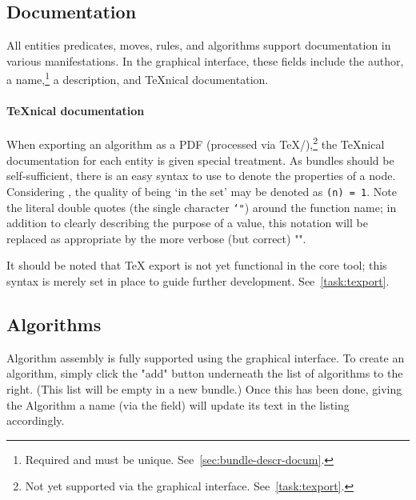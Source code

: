 \subsection{Documentation}
All entities \Dash predicates, moves, rules, and algorithms \Dash support documentation in various manifestations.
In the graphical interface, these fields include the author,
  a name,\footnote{Required and must be unique.  See~\autoref{sec:bundle-descr-docum}.}
  a description, and \TeX nical documentation.
\paragraph{\TeX nical documentation}
When exporting an algorithm as a PDF (processed via \TeX\slash\TikZ),\footnote{%
  Not yet supported via the graphical interface.
  See~\autoref{task:texport}.}
  the \TeX nical documentation for each entity is given special treatment.
As bundles should be self-sufficient,
  there is an easy syntax to use to denote the properties of a node.
Considering , the quality of being \enquote*{in the set}
  may be denoted as \texttt{(n) = 1}.
Note the literal double quotes (the single character \texttt{\char`"}) around the function name;
  in addition to clearly describing the purpose of a value,
  this notation will be replaced as appropriate by
  the more verbose (but correct) "".

It should be noted that {\TeX} export is not yet functional in the core tool;
  this syntax is merely set in place to guide further development.
See~\autoref{task:texport}.
\subsection{Algorithms}

Algorithm assembly is fully supported using the graphical interface.
To create an algorithm, simply click the "add" button
  underneath the list of algorithms to the right.
(This list will be empty in a new bundle.)
Once this has been done, giving the Algorithm a name (via the  field)
  will update its text in the listing accordingly.


